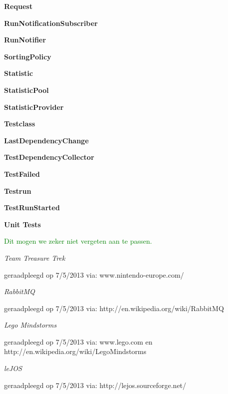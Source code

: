 \documentclass[i2]{oss}
\newcommand{\gloss}[1]{\textbf{#1}}
\newcommand{\comment}[1]{{\huge \textcolor{green}{#1}}\\}
\begin{document}
\begin{description}
\item \gloss{Request}

\item \gloss{RunNotificationSubscriber}

\item \gloss{RunNotifier}

\item \gloss{SortingPolicy}

\item \gloss{Statistic}

\item \gloss{StatisticPool}

\item \gloss{StatisticProvider}

\item \gloss{Testclass}

\item \gloss{LastDependencyChange}

\item \gloss{TestDependencyCollector}

\item \gloss{TestFailed}

\item \gloss{Testrun}

\item \gloss{TestRunStarted}

\item \gloss{Unit Tests}

 
\end{description}

\newpage
\comment{Dit mogen we zeker niet vergeten aan te passen.}
\begin{flushleft}
\begin{thebibliography}{9}

\textit{Team Treasure Trek}
\begin{scriptsize}
geraadpleegd op 7/5/2013 via: \mbox{www.nintendo-europe.com/}
\end{scriptsize}

\textit{RabbitMQ}
\begin{scriptsize}
geraadpleegd op 7/5/2013 via: \mbox{http://en.wikipedia.org/wiki/RabbitMQ}
\end{scriptsize}

\textit{Lego Mindstorms}
\begin{scriptsize}
geraadpleegd op 7/5/2013 via: \mbox{www.lego.com} en \mbox{http://en.wikipedia.org/wiki/Lego\textendash Mindstorms}
\end{scriptsize}

\textit{leJOS}
\begin{scriptsize}
geraadpleegd op 7/5/2013 via: \mbox{http://lejos.sourceforge.net/}
\end{scriptsize}


\end{thebibliography}
\end{flushleft}
\end{document}
